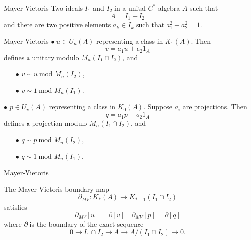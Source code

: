 \begin{frame}{Mayer-Vietoris}
Two ideals $I_1$ and $I_2$ in a unital $C^*$-algebra $A$ such that 
\[A= I_1 + I_2\]
and there are two positive elements $a_k  \in I_k$ such that $a_1^2+a_2^2 = 1$.\\
\end{frame}

\begin{frame}{Mayer-Vietoris}
$\bullet$ $u \in U_n(A)$ representing a class in $K_1(A)$. Then
\[v = a_1 u +a_2 1_A\]
defines a unitary modulo $M_n(I_1\cap I_2)$, and
\begin{itemize}
\item[$\bullet$] $v \sim u \  \text{mod } M_n(I_2)$,
\item[$\bullet$] $v \sim 1 \  \text{mod } M_n(I_1)$.
\end{itemize}
$\bullet$ $p \in U_n(A)$ representing a class in $K_0(A)$. Suppose $a_i$ are projections. Then
\[q = a_1 p +a_2 1_A\]
defines a projection modulo $M_n(I_1\cap I_2)$, and
\begin{itemize}
\item[$\bullet$] $q \sim p \  \text{mod } M_n(I_2)$,
\item[$\bullet$] $q \sim 1 \  \text{mod } M_n(I_1)$.
\end{itemize}
\end{frame}

\begin{frame}{Mayer-Vietoris}
\begin{propfr}
The Mayer-Vietoris boundary map \[\partial_{MV} : K_*(A) \rightarrow K_{*+1}(I_1\cap I_2)\]
satisfies \[\partial_{MV}[u]=  \partial [v] \quad \partial_{MV}[p]=  \partial [q]\]
where $\partial$ is the boundary of the exact sequence
\[0 \rightarrow I_1\cap I_2 \rightarrow  A \rightarrow  A/(I_1\cap I_2) \rightarrow  0.\]
\end{propfr}
\end{frame} 